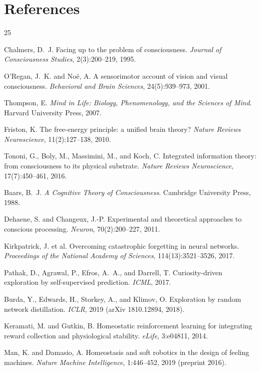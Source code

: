 \documentclass[11pt,a4paper]{article}
\begin{document}
\section*{References}
\begin{thebibliography}{25}

 Chalmers, D.~J. Facing up to the problem of consciousness. \textit{Journal of Consciousness Studies}, 2(3):200--219, 1995.

 O'Regan, J.~K. and No\"e, A. A sensorimotor account of vision and visual consciousness. \textit{Behavioral and Brain Sciences}, 24(5):939--973, 2001.

 Thompson, E. \textit{Mind in Life: Biology, Phenomenology, and the Sciences of Mind}. Harvard University Press, 2007.

 Friston, K. The free-energy principle: a unified brain theory? \textit{Nature Reviews Neuroscience}, 11(2):127--138, 2010.

 Tononi, G., Boly, M., Massimini, M., and Koch, C. Integrated information theory: from consciousness to its physical substrate. \textit{Nature Reviews Neuroscience}, 17(7):450--461, 2016.

 Baars, B.~J. \textit{A Cognitive Theory of Consciousness}. Cambridge University Press, 1988.

 Dehaene, S. and Changeux, J.-P. Experimental and theoretical approaches to conscious processing. \textit{Neuron}, 70(2):200--227, 2011.

 Kirkpatrick, J. et al. Overcoming catastrophic forgetting in neural networks. \textit{Proceedings of the National Academy of Sciences}, 114(13):3521--3526, 2017.

 Pathak, D., Agrawal, P., Efros, A.~A., and Darrell, T. Curiosity-driven exploration by self-supervised prediction. \textit{ICML}, 2017.

 Burda, Y., Edwards, H., Storkey, A., and Klimov, O. Exploration by random network distillation. \textit{ICLR}, 2019 (arXiv 1810.12894, 2018).

 Keramati, M. and Gutkin, B. Homeostatic reinforcement learning for integrating reward collection and physiological stability. \textit{eLife}, 3:e04811, 2014.

 Man, K. and Damasio, A. Homeostasis and soft robotics in the design of feeling machines. \textit{Nature Machine Intelligence}, 1:446--452, 2019 (preprint 2016).


\end{thebibliography}
\end{document}
